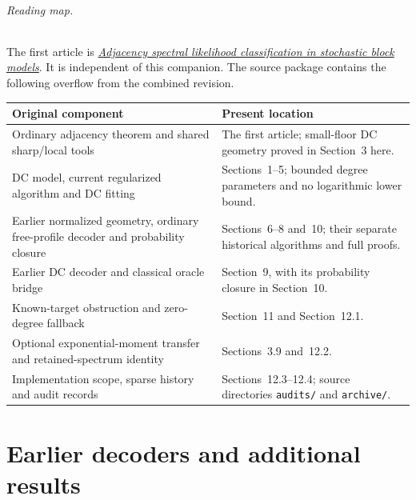 \documentclass[11pt]{article}
\theoremstyle{definition}
\theoremstyle{remark}
\begin{document}
\paragraph{Reading map.}
The first article is
\href{../sbm/sbm_spectral_likelihood.pdf}{\emph{Adjacency spectral likelihood classification in stochastic block models}}.
It is independent of this companion. The source package contains the
following overflow from the combined revision.
\begin{center}
\small
\begin{tabular}{>{\raggedright\arraybackslash}p{}>{\raggedright\arraybackslash}p{}}
\toprule
Original component & Present location\\
\midrule
Ordinary adjacency theorem and shared sharp/local tools
& The first article; small-floor DC geometry proved in Section~3 here.\\[3pt]
DC model, current regularized algorithm and DC fitting
& Sections~1--5; bounded degree parameters and no logarithmic lower bound.\\[3pt]
Earlier normalized geometry, ordinary free-profile decoder and probability closure
& Sections~6--8 and~10; their separate historical algorithms and full proofs.\\[3pt]
Earlier DC decoder and classical oracle bridge
& Section~9, with its probability closure in Section~10.\\[3pt]
Known-target obstruction and zero-degree fallback
& Section~11 and Section~12.1.\\[3pt]
Optional exponential-moment transfer and retained-spectrum identity
& Sections~3.9 and~12.2.\\[3pt]
Implementation scope, sparse history and audit records
& Sections~12.3--12.4; source directories \texttt{audits/} and \texttt{archive/}.\\
\bottomrule
\end{tabular}
\end{center}
\clearpage
\setcounter{tocdepth}{1}
\tableofcontents
\clearpage





\clearpage
\part{Earlier decoders and additional results}









\end{document}
